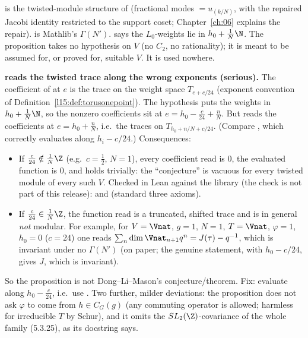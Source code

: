 \begin{dictionary}
 is the twisted-module structure of  (fractional modes 
$=u_{(k/N)}$, with the repaired Jacobi identity restricted to the support coset; Chapter~\ref{ch:06} explains the
repair).  is Mathlib's $\Gamma(N')$.  says the $L_0$-weights lie in
$h_0+\frac1N\N$. The proposition takes no hypothesis on $V$ (no $C_2$, no rationality); it is meant to be assumed for, or
proved for, suitable $V$. It is used nowhere.
\end{dictionary}

\begin{warning}
\textbf{ reads the twisted trace along the wrong exponents (serious).} The coefficient of
 at $e$ is the trace on the weight space $T_{e+c/24}$ (exponent convention of
Definition~\ref{l15:def:torusonepoint}). The hypothesis puts the weights in $h_0+\frac1N\N$, so the nonzero coefficients sit at
$e=h_0-\frac c{24}+\frac nN$. But  reads the coefficients at $e=h_0+\frac nN$, i.e.\ the
traces on $T_{h_0+n/N+c/24}$. (Compare , which correctly evaluates along $h_i-c/24$.) Consequences:
\begin{itemize}
\item If $\frac c{24}\notin\frac1N\Z$ (e.g.\ $c=\frac12$, $N=1$), every coefficient read is $0$, the evaluated function is $0$,
  and  holds trivially: the ``conjecture'' is vacuous for every twisted module of every such $V$.
  Checked in Lean against the library (the check is not part of this release): \allowbreak{}
  and \allowbreak{} (standard three axioms).
\item If $\frac c{24}\in\frac1N\Z$, the function read is a truncated, shifted trace and is in general \emph{not} modular. For
  example, for $V=\Vnat$, $g=1$, $N=1$, $T=\Vnat$, $\varphi=1$, $h_0=0$ ($c=24$) one reads
  $\sum_n\dim\Vnat_{n+1}q^n=J(\tau)-q^{-1}$, which is invariant under no $\Gamma(N')$ (on paper; the genuine statement, with
  $h_0-c/24$, gives $J$, which is invariant).
\end{itemize}
So the proposition is not Dong--Li--Mason's conjecture/theorem. Fix: evaluate along $h_0-\frac c{24}$, i.e.\ use
. Two further, milder deviations: the proposition does not
ask $\varphi$ to come from $h\in C_G(g)$ (any commuting operator is allowed; harmless for irreducible $T$ by Schur), and it
omits the $\lfifteenSL$-covariance of the whole family (5.3.25), as its docstring says.
\end{warning}

